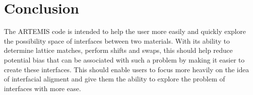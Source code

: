 \documentclass[12pt,a4paper,onecolumn,titlepage]{report}
\newcommand{\artemis}{{ARTEMIS}}
\begin{document}
\section{Conclusion}

The \artemis{} code is intended to help the user more easily and quickly explore the possibility space of interfaces between two materials. With its ability to determine lattice matches, perform shifts and swaps, this should help reduce potential bias that can be associated with such a problem by making it easier to create these interfaces. This should enable users to focus more heavily on the idea of interfacial aligment and give them the ability to explore the problem of interfaces with more ease.


%
\end{document}
